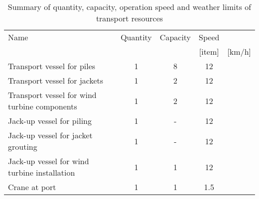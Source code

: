 \begin{table}
\label{tab:input}
\begin{tabular}{lcccc}
\hline 
Name & Quantity & Capacity & Speed \\
& & & [item] & [km/h] \\ 
\hline 
Transport vessel for piles & 1 & 8 & 12 \\ 
Transport vessel for jackets & 1 & 2 & 12 \\ 
Transport vessel for wind turbine components & 1 & 2 & 12 \\ 
Jack-up vessel for piling & 1 & - & 12\\
Jack-up vessel for jacket grouting & 1 & - & 12\\
Jack-up vessel for wind turbine installation & 1 & 1 & 12 \\
Crane at port & 1 & 1 & 1.5 \\
\hline 
\end{tabular}

\caption{Summary of quantity, capacity, operation speed and weather limits of transport resources}
\end{table}
